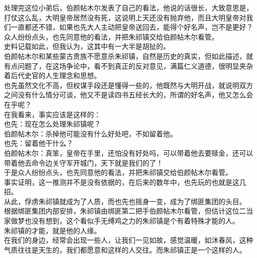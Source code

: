 \begin{multicols}{\theparacolNo}
处理完这位小弟后，伯颜帖木尔发表了自己的看法，他说的话很长，大致意思是，打仗这么乱，大明皇帝居然没有死，这说明上天还没有抛弃他，而且大明皇帝对我们一直都还不错，如果也先大人主动把皇帝送回去，能得个好名声，岂不是更好？\\

众人纷纷点头，也先同意他的看法，并把朱祁镇交给伯颜帖木尔看管。\\

史料记载如此，但我认为，这其中有一大半是胡扯的。\\

伯颜帖木尔和某些蒙古贵族不愿意杀朱祁镇，自然是历史的真实，但如此描述，就有点问题了，在这场争论中，看不到真正的反对意见，满篇仁义道德，很明显夹杂着后代史官的人生理念和思想。\\

也先虽然文化不高，但权谋手段还是懂得一些的，他既然与大明开战，就说明双方之间没有什么情分可谈，他又不是读四书五经长大的，所谓的好名声，他又怎么会在乎呢？\\

在我看来，事实应该是这样的：\\

也先：现在怎么处理朱祁镇呢？\\

伯颜帖木尔：杀掉他可能没有什么好处吧，不如留着他。\\

也先：留着他干什么？\\

伯颜帖木尔：真笨，皇帝在手里，还怕没有好处吗，可以带着他去要赎金，还可以带着他去命令边关守军开城门，天下就是我们的了！\\

于是众人纷纷点头，也先同意他的看法，并把朱祁镇交给伯颜帖木尔看管。\\

事实证明，这一推测并不是没有依据的，在后来的数年中，也先玩的也就是这几招。\\

从此，俘虏朱祁镇就成为了人质，而也先也摇身一变，成为了绑匪集团的头目。\\

根据绑匪集团内部安排，朱祁镇由绑匪第二把手伯颜帖木尔看管，但估计这位二当家做梦也没有想到，这个看似手无缚鸡之力的朱祁镇是个有着特殊才能的人。\\

朱祁镇的才能，就是他的人缘。\\

在我们的身边，经常会出现一些人，让我们一见如故，感觉温暖，如沐春风，这种气质往往是天生的，我们都愿意和这样的人交往。而朱祁镇正是一个这样的人。\\


\end{multicols}
